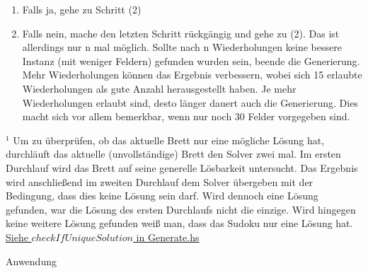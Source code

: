 \begin{enumerate}[(1)]
\begin{enumerate}[(1)]
\begin{enumerate}
                \item Falls ja, gehe zu Schritt (2)
                \item Falls nein, mache den letzten Schritt rückgängig und gehe zu (2). \newline
                Das ist allerdings nur n mal möglich. Sollte nach n Wiederholungen keine bessere Instanz (mit weniger Feldern) gefunden wurden sein, beende die Generierung. Mehr Wiederholungen können das Ergebnis verbessern, wobei sich 15 erlaubte Wiederholungen als gute Anzahl herausgestellt haben. Je mehr Wiederholungen erlaubt sind, desto länger dauert auch die Generierung. Dies macht sich vor allem bemerkbar, wenn nur noch 30 Felder vorgegeben sind.
            \end{enumerate}
        \end{enumerate}
\end{enumerate}
$^1$ Um zu überprüfen, ob das aktuelle Brett nur eine mögliche Lösung hat, durchläuft das aktuelle (unvollständige) Brett den Solver zwei mal. Im ersten Durchlauf wird das Brett auf seine generelle Lösbarkeit untersucht. Das Ergebnis wird anschließend im zweiten Durchlauf dem Solver übergeben mit der Bedingung, dass dies keine Lösung sein darf. Wird dennoch eine Lösung gefunden, war die Lösung des ersten Durchlaufs nicht die einzige. Wird hingegen keine weitere Lösung gefunden weiß man, dass das Sudoku nur eine Lösung hat. \newline
\underline{Siehe \(checkIfUniqueSolution\) in Generate.hs}

\vspace{2ex}

\begin{Large}
    Anwendung
\end{Large}
\vspace{2ex}

